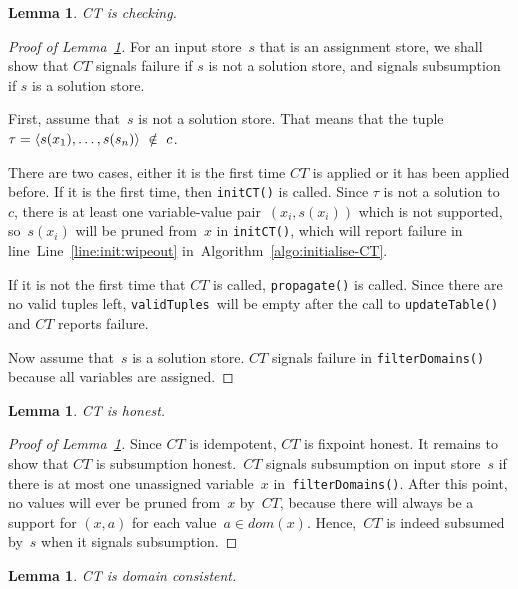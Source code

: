 \documentclass[a4paper,11pt]{article}
\newtheorem{lemma}[theorem]{Lemma}
\newcommand{\T}[1]{\texttt{#1}}
\newcommand{\Algoref}[1]{Algorithm~\ref{#1}}
\newcommand{\Lineref}[1]{Line~\ref{#1}}
\newcommand{\Lemmaref}[1]{Lemma~\ref{#1}}
\newcommand{\CurrTable}{\texttt{validTuples}}
\numberwithin{equation}{section}
\begin{document}
\begin{lemma}\label{lemma:checking}
  CT is checking.
\end{lemma}

\begin{proof}[Proof of \Lemmaref{lemma:checking}]
  For an input store~$s$ that is an assignment store, we shall show that $CT$
  signals failure if $s$ is not a solution store, and signals subsumption if
  $s$ is a solution store. 

  First, assume that~$s$ is not a solution store. That means that the tuple
  $\tau = \left\langle s(x_1),\ldots,s(s_n)\right\rangle~\notin~c$.
 
  There are two cases, either
  it is the first time $CT$ is applied or it has been applied before.
  If it is the first time, then \T{initCT()} is called.
  Since $\tau$ is not a solution to~$c$, there is at least one variable-value
  pair~$(x_i,s(x_i))$ which is not supported, so~$s(x_i)$ will be pruned
  from~$x$ in \T{initCT()}, which will report failure in line~\Lineref{line:init:wipeout}
  in~\Algoref{algo:initialise-CT}.
  
  If it is not the first time that $CT$ is called, \T{propagate()} is called.
  Since there are no valid tuples left, \CurrTable~will be empty after
  the call to \T{updateTable()} and $CT$ reports failure.
  
  Now assume that~$s$ is a solution store. 
  $CT$ signals failure in \T{filterDomains()} because all variables are assigned.

\end{proof}

\begin{lemma}\label{lemma:honest}
  CT is honest.
\end{lemma}

\begin{proof}[Proof of \Lemmaref{lemma:honest}]
  Since $CT$ is idempotent, $CT$ is fixpoint honest. It remains to show that
  $CT$ is subsumption honest.~$CT$ signals subsumption on input store~$s$
  if there is at most one
  unassigned variable~$x$ in~\T{filterDomains()}. After this point, no values will
  ever be pruned from~$x$ by~$CT$, because there will always be a support for
  $(x,a)$ for each value~$a \in dom(x)$. Hence,~$CT$ is indeed subsumed by~$s$
  when it signals subsumption.
    
\end{proof}

\begin{lemma}\label{lemma:domain-consistent}
  CT is domain consistent.
\end{lemma}
\end{document}
